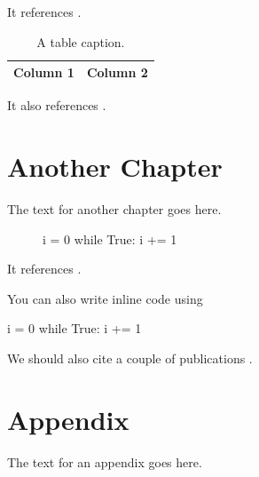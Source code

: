 \documentclass[a4paper]{phdthesis}
\begin{document}
It references .

\begin{table}
  \center
  \caption{A table caption.\label{tab:1}}
  \begin{tabular}{cc}
    \toprule
    Column 1 & Column 2\\
    \bottomrule
  \end{tabular}
\end{table}

It also references .

\chapter{Another Chapter}
The text for another chapter goes here.

\begin{figure}
  \begin{algorithm}[caption={An algorithm caption.}, label=alg:1]
    i = 0
    while True:
      i += 1
  \end{algorithm}
\end{figure}

It references .

You can also write inline code using

\begin{python}
i = 0
while True:
  i += 1
\end{python}

We should also cite a couple of publications \cite{Diem2017a,Diem2017b}.

\appendix
\chapter{Appendix}
The text for an appendix goes here.

\backmatter


\end{document}
